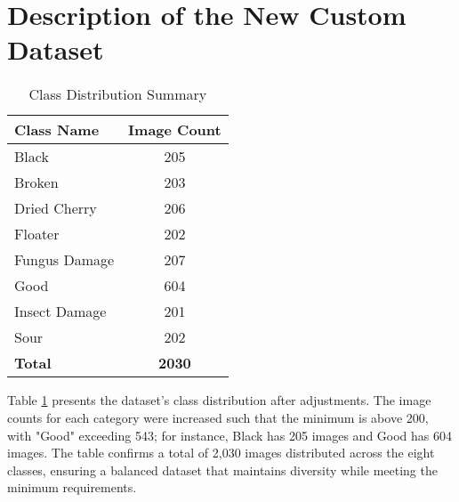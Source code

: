 \section{Description of the New Custom Dataset}
\label{sec:description_dataset}
\begin{table}[H]
	\centering
	\caption{Class Distribution Summary}
	\label{tab:class_dist_summary}
	\begin{tabular}{l c}
	\toprule
	\textbf{Class Name} & \textbf{Image Count} \\
	\midrule
	Black & 205 \\
	Broken & 203 \\
	Dried Cherry & 206 \\
	Floater & 202 \\
	Fungus Damage & 207 \\
	Good & 604 \\
	Insect Damage & 201 \\
	Sour & 202 \\
	\midrule
	\textbf{Total} & \textbf{2030} \\
	\bottomrule
	\end{tabular}
\end{table}

Table \ref{tab:class_dist_summary} presents the dataset's class distribution after adjustments. The image counts for each category were increased such that the minimum is above 200, with "Good" exceeding 543; for instance, Black has 205 images and Good has 604 images. The table confirms a total of 2,030 images distributed across the eight classes, ensuring a balanced dataset that maintains diversity while meeting the minimum requirements.

\begin{table}[H]
    \centering
    \caption{Dataset Split Summary}
    \label{tab:dataset_split_summary}
\end{table}


